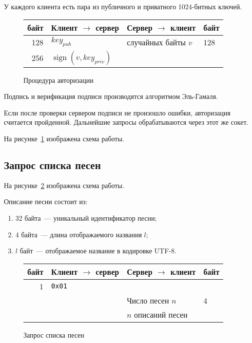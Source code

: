 У каждого клиента есть пара из публичного и приватного 1024-битных
ключей. 

\begin{figure}
  \label{aut}
  \centering

  \begin{tabular}{|r|l|l|l|}
    \hline
    байт & Клиент $\to$ сервер & Сервер $\to$ клиент & байт \\
    \hline
    128 & $key_{pub}$ & случайных байты $v$ & 128 \\
    \hline
    256 & $\operatorname{sign}(v, key_{priv})$ & &\\
    \hline
  \end{tabular}

  \caption{Процедура авторизации}
\end{figure}

Подпись и верификация подписи производятся алгоритмом Эль-Гамаля.

Если после проверки сервером подписи не произошло ошибки, авторизация
считается пройденной. Дальнейшие запросы обрабатываются через этот же
сокет.

На рисунке~\ref{aut} изображена схема работы.

\subsection{Запрос списка песен}

На рисунке~\ref{songs} изображена схема работы.

Описание песни состоит из:

\begin{enumerate}
\item 32 байта~--- уникальный идентификатор песни;
\item 4 байта~--- длина отображаемого названия $l$;
\item $l$ байт~--- отображаемое название в кодировке UTF-8.
\end{enumerate}

\begin{figure}
  \label{songs}
  \centering

  \begin{tabular}{|r|l|l|l|}
    \hline
    байт & Клиент $\to$ сервер & Сервер $\to$ клиент & байт \\
    \hline
    1 & \texttt{0x01} & & \\
    \hline
    & & Число песен $n$ & 4 \\
    \hline
    & & $n$ описаний песен & \\
    \hline
  \end{tabular}

  \caption{Запрос списка песен}
\end{figure}

